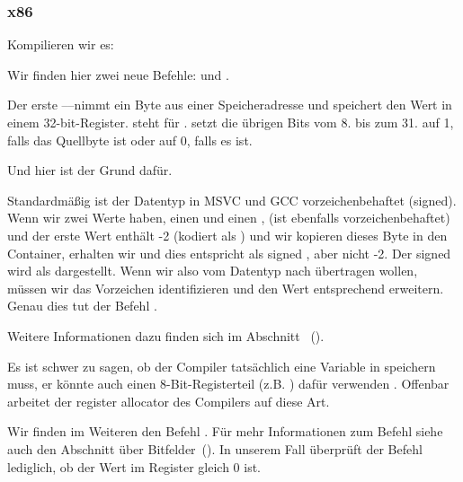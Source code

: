 \subsubsection{x86}


Kompilieren wir es:




Wir finden hier zwei neue Befehle: \MOVSX und \TEST.

\label{MOVSX}

Der erste --\MOVSX--nimmt ein Byte aus einer Speicheradresse und speichert den
Wert in einem 32-bit-Register.
\MOVSX steht für .
\MOVSX setzt die übrigen Bits vom 8. bis zum 31. auf 1, falls das Quellbyte
 ist oder auf 0, falls es  ist.

Und hier ist der Grund dafür.

Standardmäßig ist der \Tchar Datentyp in MSVC und GCC vorzeichenbehaftet
(signed). Wenn wir zwei Werte haben, einen \Tchar und einen \Tint, (\Tint ist
ebenfalls vorzeichenbehaftet) und der erste Wert enthält -2 (kodiert als
) und wir kopieren dieses Byte in den \Tint Container, erhalten wir
 und dies entspricht als signed , aber nicht -2. Der
signed  wird als  dargestellt. Wenn wir also 
vom Datentyp \Tchar nach \Tint übertragen wollen, müssen wir das Vorzeichen
identifizieren und den Wert entsprechend erweitern. Genau dies tut der Befehl
\MOVSX.

Weitere Informationen dazu finden sich im Abschnitt
\q{\IT{\SignedNumbersSectionName}} ~().

Es ist schwer zu sagen, ob der Compiler tatsächlich eine \Tchar Variable in \EDX
speichern muss, er könnte auch einen 8-Bit-Registerteil (z.B. \DL) dafür
verwenden . Offenbar arbeitet der \gls{register allocator} des Compilers auf
diese Art.


Wir finden im Weiteren den Befehl . 
Für mehr Informationen zum \TEST Befehl siehe auch den Abschnitt über
Bitfelder~().
In unserem Fall überprüft der Befehl lediglich, ob der Wert im Register \EDX
gleich 0 ist.

